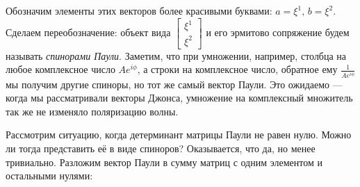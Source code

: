 Обозначим элементы этих векторов более красивыми буквами: $a = \xi^1,\, b =
  \xi^2$. Сделаем переобозначение: объект вида $\begin{bmatrix} \xi^1 \\ \xi^2 \end{bmatrix}$ и его эрмитово сопряжение будем называть \textit{спинорами Паули}. Заметим,
что при умножении, например, столбца на любое комплексное число $Ae^{i\phi}$, а
строки на комплексное число, обратное ему $\frac{1}{Ae^{i\phi}}$ мы получим
другие спиноры, но тот же самый вектор Паули. Это ожидаемо --- когда мы
рассматривали векторы Джонса, умножение на комплексный множитель так же не
изменяло поляризацию волны.

Рассмотрим ситуацию, когда детерминант матрицы Паули не равен нулю. Можно ли
тогда представить её в виде спиноров? Оказывается, что да, но менее тривиально.
Разложим вектор Паули в сумму матриц с одним элементом и остальными нулями:
